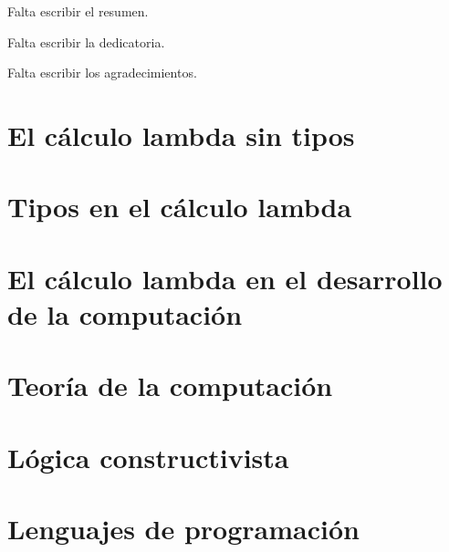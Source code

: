 \documentclass[12pt]{tesislcc}
\begin{document}

\portada%

\frontmatter

\begin{resumen}
  Falta escribir el resumen.
\end{resumen}

\begin{dedicatoria}
  Falta escribir la dedicatoria.
\end{dedicatoria}

\begin{agradecimientos}
  Falta escribir los agradecimientos.
\end{agradecimientos}

\tableofcontents

\mainmatter%

\introduccion%


\chapter{El cálculo lambda sin tipos}


\chapter{Tipos en el cálculo lambda}


\chapter{El cálculo lambda en el desarrollo de la computación}


\chapter{Teoría de la computación}


\chapter{Lógica constructivista}


\chapter{Lenguajes de programación}

\end{document}
